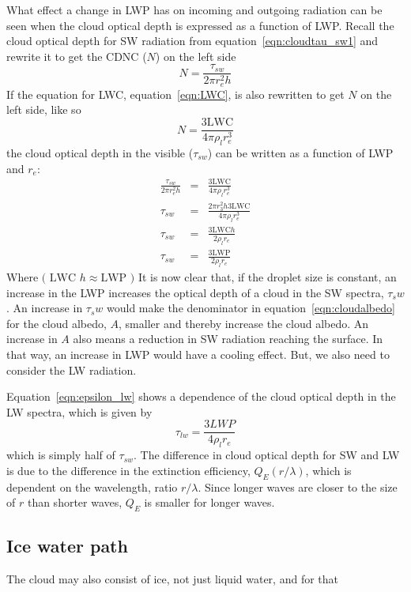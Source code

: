 What effect a change in LWP has on incoming and outgoing radiation can be seen when the cloud optical depth is expressed as a function of LWP. Recall the cloud optical depth for SW radiation from equation~\ref{eqn:cloudtau_sw1} and rewrite it to get the CDNC ($N$) on the left side
\begin{equation}
N = \frac{\tau_{sw}}{2\pi r^2_e h}
\end{equation}
If the equation for LWC, equation~\ref{eqn:LWC}, is also rewritten to get $N$ on the left side, like so
\begin{equation}
N = \frac{3\text{LWC}}{4\pi \rho_l r^3_e}
\end{equation}
the cloud optical depth in the visible ($\tau_{sw}$) can be written as a function of LWP and $r_e$:
\begin{eqnarray}
\frac{\tau_{sw}}{2\pi r^2_e h} &=& \frac{3\text{LWC}}{4\pi \rho_l r^3_e}\\
\tau_{sw} &=& \frac{2\pi r^2_3 h 3\text{LWC}}{4\pi \rho_l r^3_e}\\
\tau_{sw} &=& \frac{3\text{LWC} h}{2\rho_l r_e}\\
\tau_{sw} &=& \frac{3\text{LWP}}{2\rho_l r_e}
\label{eqn:cloudtau_sw}
\end{eqnarray}
Where $\text{( LWC }h \approx \text{LWP )}$
It is now clear that, if the droplet size is constant, an increase in the LWP increases the optical depth of a cloud in the SW spectra, $\tau_sw$. An increase in $\tau_sw$ would make the denominator in equation~\ref{eqn:cloudalbedo} for the cloud albedo, $A$, smaller and thereby increase the cloud albedo. An increase in $A$ also means a reduction in SW radiation reaching the surface. In that way, an increase in LWP would have a cooling effect. But, we also need to consider the LW radiation. 

Equation~\ref{eqn:epsilon_lw} shows a dependence of the cloud optical depth in the LW spectra, which is given by
\begin{equation}
\tau_{lw} = \frac{3LWP}{4\rho_l r_e}
\label{eqn:tau_lw}
\end{equation}
which is simply half of $\tau_{sw}$. The difference in cloud optical depth for SW and LW is due to the difference in the extinction efficiency, $Q_E(r/\lambda)$, which is dependent on the wavelength, ratio $r/\lambda$. Since longer waves are closer to the size of $r$ than shorter waves, $Q_E$ is smaller for longer waves.

\subsection{Ice water path}
The cloud may also consist of ice, not just liquid water, and for that 


